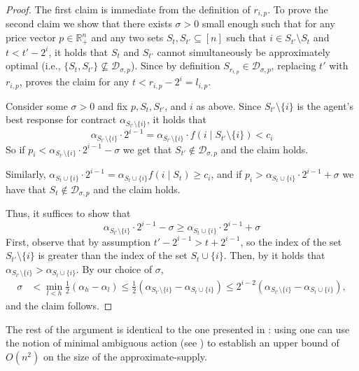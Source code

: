 \documentclass[11pt]{article}
\newcommand{\reals}{\mathbb{R}}
\newcommand{\supply}[2]{\mathcal{D}_{{#1},{#2}}}
\newcommand{\supSigP}{\supply{\sigma}{p}}
\begin{document}
\begin{proof}
    The first claim is immediate from the definition of $r_{i,p}$.
    To prove the second claim we show that there exists $\sigma > 0$ small enough such that for any price vector $p \in \reals_{+}^n$ and any two sets $S_t,S_{t'} \subseteq [n]$ such that $i \in S_{t'} \setminus S_t$ and $t < t' - 2^i$, it holds that $S_t$ and $S_{t'}$ cannot simultaneously be approximately optimal (i.e., $\{S_t,S_{t'}\} \not\subseteq \supSigP$).
    Since by definition $S_{r_{i,p}} \in \supSigP$, replacing $t'$ with $r_{i,p}$, proves the claim for any $t < r_{i,p} - 2^i = l_{i,p}$.

    Consider some $\sigma > 0$ and fix $p, S_t, S_{t'}$, and $i$ as above. 
    Since $S_{t'} \setminus \{i\}$ is the agent's best response for contract $\alpha_{S_{t'}\setminus \{i\}}$, it holds that
    $$
    \alpha_{S_{t'}\setminus\{i\}} \cdot 2^{i-1}
    =
    \alpha_{S_{t'}\setminus\{i\}} \cdot f(i \mid S_{t'} \setminus\{i\}) < c_i
    $$
    So if $p_i < \alpha_{S_{t'}\setminus\{i\}} \cdot 2^{i-1}  - \sigma$ we get that $S_{t'} \notin \supSigP$ and the claim holds.
    
    Similarly, $\alpha_{S_t \cup \{i\}} \cdot 2^{i-1}=\alpha_{S_t \cup \{i\}} f(i \mid S_t) \ge c_i$, and if $p_i > \alpha_{S_t \cup \{i\}} \cdot 2^{i-1} + \sigma$ we have that $S_t \notin \supSigP$ and the claim holds.

    Thus, it suffices to show that
    $$
    \alpha_{S_{t'}\setminus\{i\}} \cdot 2^{i-1}  - \sigma
    \ge
    \alpha_{S_t \cup \{i\}} \cdot 2^{i-1} + \sigma
    $$
    First, observe that by assumption $t' - 2^{i-1} > t + 2^{i-1}$, so the index of the set $S_{t'} \setminus \{i\}$ is greater than the index of the set $S_t \cup \{i\}$.    
    Then, by  it holds that $\alpha_{S_{t'}\setminus \{i\}} > \alpha_{S_t\cup \{i\}}$. 
    By our choice of $\sigma$,
    \begin{align*}
        \sigma 
        &<
        \min_{l < h} \frac{1}{2}(\alpha_h - \alpha_l)
        \le 
        \frac{1}{2}(\alpha_{S_{t'}\setminus \{i\}} - \alpha_{S_{t}\cup \{i\}}) \le 2^{i-2}(\alpha_{S_{t'}\setminus \{i\}} - \alpha_{S_{t}\cup \{i\}}),
    \end{align*}
    and the claim follows.
\end{proof}

The rest of the argument is identical to the one presented in : using  one can use the notion of minimal ambiguous action (see ) to establish an upper bound of $O(n^2)$ on the size of the approximate-supply.
\end{document}

